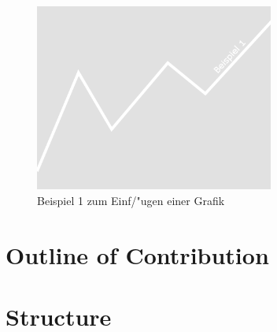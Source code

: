 \begin{figure}
	\centering
		\includegraphics[width=0.7\textwidth]{./Pictures/bsp1.png}
	\caption{Beispiel 1 zum Einf{/"u}gen einer Grafik}
	\label{fig:bsp1}
\end{figure}

\section{Outline of Contribution}

\section{Structure}

